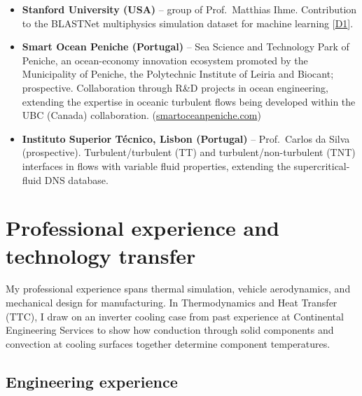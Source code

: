 \documentclass[11pt]{article}
\begin{document}
\begin{itemize}
  application of non-stationary transfer-entropy frameworks to extreme wall-heat-flux events
  in supercritical fluid flows.
  \item \textbf{Stanford University (USA)} -- group of Prof.\ Matthias Ihme. Contribution
  to the BLASTNet multiphysics simulation dataset for machine learning [\hyperlink{pub-D1}{D1}].
  \item \textbf{Smart Ocean Peniche (Portugal)} -- Sea Science and Technology Park
  of Peniche, an ocean-economy innovation ecosystem promoted by the Municipality of
  Peniche, the Polytechnic Institute of Leiria and Biocant; prospective.
  Collaboration through R\&D projects in ocean engineering, extending the expertise in oceanic turbulent flows being developed within the UBC (Canada) collaboration.
  (\href{https://smartoceanpeniche.com}{smartoceanpeniche.com})
  \item \textbf{Instituto Superior T{\'e}cnico, Lisbon (Portugal)} -- Prof.\ Carlos da Silva
  (prospective). Turbulent/turbulent (TT) and turbulent/non-turbulent (TNT) interfaces in
  flows with variable fluid properties, extending the supercritical-fluid DNS database.
\end{itemize}

\section{Professional experience and technology transfer}\label{sec:prof}

My professional experience spans thermal simulation, vehicle aerodynamics, and mechanical design for manufacturing. In Thermodynamics and Heat Transfer (TTC), I draw on an inverter cooling case from past experience at Continental Engineering Services to show how conduction through solid components and convection at cooling surfaces together determine component temperatures.

\subsection{Engineering experience}
\end{document}
